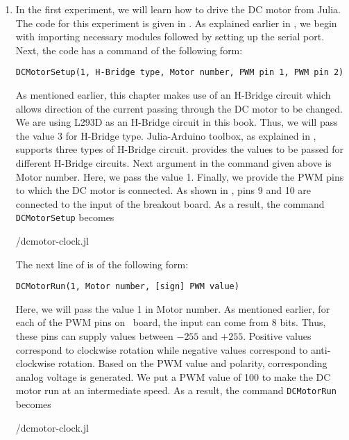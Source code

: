 \begin{enumerate}
  \item In the first experiment, we will learn how to drive the DC motor
        from Julia. The code for this experiment is 
        given in  . 
        As explained earlier in , we begin with 
        importing necessary modules followed by setting up the serial port. 
        Next, the code has a command of the following form: 
        \begin{lstlisting}[style=nonumbers]
          DCMotorSetup(1, H-Bridge type, Motor number, PWM pin 1, PWM pin 2)
        \end{lstlisting}
        As mentioned earlier, this chapter makes use of an H-Bridge circuit which 
        allows direction of the current passing through the DC motor to be changed.
        We are using L293D as an H-Bridge circuit in this book. Thus, we will pass the value 3 for
        H-Bridge type. Julia-Arduino toolbox, as explained in , 
        supports three types of H-Bridge circuit. 
        provides the values to be passed for different H-Bridge circuits. 
        Next argument in the command given above is Motor number. Here, we pass the value 1. 
        Finally, we provide the PWM pins to which the DC motor is connected. As 
        shown in , pins 9 and 10 are connected to the
        input of the breakout board. As a result, the command {\tt DCMotorSetup} becomes
        
        {\LocDCMjuliacode/dcmotor-clock.jl}
        
        The next line of  is of the following form: 
        \begin{lstlisting}[style=nonumbers]
          DCMotorRun(1, Motor number, [sign] PWM value)
        \end{lstlisting}
        Here, we will pass the value 1 in Motor number.  As mentioned earlier, 
        for each of the PWM pins on \arduino\ board, the input can come from 8 bits.
        Thus, these pins can supply values between $- 255$ and $+ 255$. Positive values correspond to clockwise
        rotation while negative values correspond to anti-clockwise rotation. Based on the PWM value and polarity, 
        corresponding analog voltage is generated.  
        We put a PWM value of 100 to make the DC motor run at an intermediate speed.  
        As a result, the command {\tt DCMotorRun} becomes
        
        {\LocDCMjuliacode/dcmotor-clock.jl}
        

\end{enumerate}
